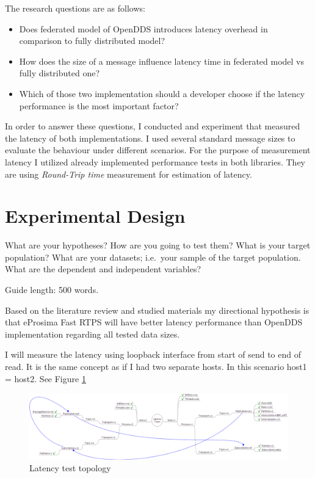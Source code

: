 \documentclass{csfourzero}
\begin{document}
The research questions are as follows:
\begin{itemize}
	\item Does federated model of OpenDDS introduces latency overhead in comparison to fully distributed model?
	\item How does the size of a message influence latency time in federated model vs fully distributed one?
	\item Which of those two implementation should a developer choose if the latency performance is the most important factor?
\end{itemize}

In order to answer these questions, I conducted and experiment that measured the latency of both implementations. I used several standard message sizes to evaluate the behaviour under different scenarios. For the purpose of measurement latency I utilized already implemented performance tests in both libraries. They are using \textit{Round-Trip time} measurement for estimation of latency. 

\section{Experimental Design}
\label{sec:exp}

What are your hypotheses? How are you going to test them? What is your
target population? What are your datasets; i.e.\ your sample of the
target population. What are the dependent and independent variables?

Guide length: 500 words.

Based on the literature review and studied materials my directional hypothesis is that eProsima Fast RTPS will have better latency performance than OpenDDS implementation regarding all tested data sizes.

I will measure the latency using loopback interface from start of send to end of read. It is the same concept as if I had two separate hosts. In this scenario host1 = host2. See Figure \ref{fig:test-topology}

\begin{figure}[!h]
	\centering
	\includegraphics[width=1\textwidth]{openDDS-latency-tests}
	\caption{\label{fig:test-topology}Latency test topology
	\cite{openDDS-test-topology}}
\end{figure}
\end{document}
